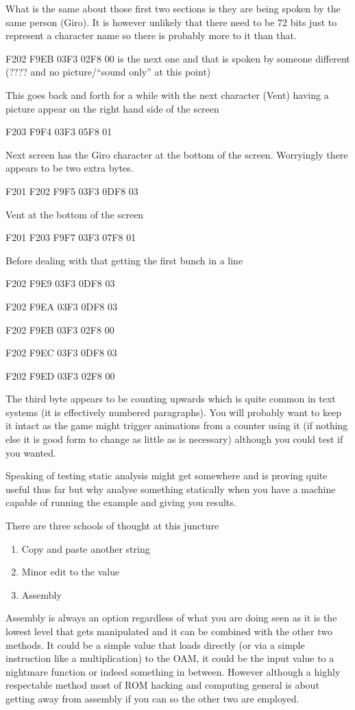 \documentclass[
]{book}
\providecommand{\tightlist}{%
  \setlength{\itemsep}{0pt}\setlength{\parskip}{0pt}}
\begin{document}
What is the same about those first two sections is they are being spoken by the same person (Giro). It is however unlikely that there need to be 72 bits just to represent a character name so there is probably more to it than that.

F202 F9EB 03F3 02F8 00 is the next one and that is spoken by someone different (???? and no picture/``sound only'' at this point)

This goes back and forth for a while with the next character (Vent) having a picture appear on the right hand side of the screen

F203 F9F4 03F3 05F8 01

Next screen has the Giro character at the bottom of the screen. Worryingly there appears to be two extra bytes.

F201 F202 F9F5 03F3 0DF8 03

Vent at the bottom of the screen

F201 F203 F9F7 03F3 07F8 01

Before dealing with that getting the first bunch in a line

F202 F9E9 03F3 0DF8 03

F202 F9EA 03F3 0DF8 03

F202 F9EB 03F3 02F8 00

F202 F9EC 03F3 0DF8 03

F202 F9ED 03F3 02F8 00

The third byte appears to be counting upwards which is quite common in text systems (it is effectively numbered paragraphs). You will probably want to keep it intact as the game might trigger animations from a counter using it (if nothing else it is good form to change as little as is necessary) although you could test if you wanted.

Speaking of testing static analysis might get somewhere and is proving quite useful thus far but why analyse something statically when you have a machine capable of running the example and giving you results.

There are three schools of thought at this juncture

\begin{enumerate}
\def\labelenumi{\arabic{enumi}.}
\tightlist
\item
  Copy and paste another string
\item
  Minor edit to the value
\item
  Assembly
\end{enumerate}

Assembly is always an option regardless of what you are doing seen as it is the lowest level that gets manipulated and it can be combined with the other two methods. It could be a simple value that loads directly (or via a simple instruction like a multiplication) to the OAM, it could be the input value to a nightmare function or indeed something in between. However although a highly respectable method most of ROM hacking and computing general is about getting away from assembly if you can so the other two are employed.
\end{document}
